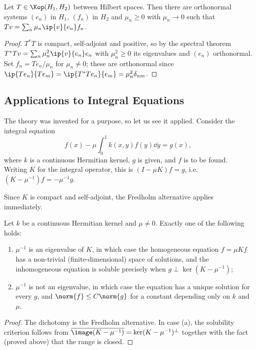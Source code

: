 \begin{corollary}
	Let $T\in\Kop(H_1,H_2)$ between Hilbert spaces. Then there are orthonormal systems $(e_n)$ in $H_1$, $(f_n)$ in $H_2$ and $\mu_n\geq0$ with $\mu_n\to0$ such that $Tv = \sum_n\mu_n\ip{v}{e_n}f_n$.
\end{corollary}

\begin{proof}
	$T^*T$ is compact, self-adjoint and positive, so by the spectral theorem $T^*Tv = \sum_n\mu_n^2\ip{v}{e_n}e_n$ with $\mu_n^2 \geq 0$ its eigenvalues and $(e_n)$ orthonormal. Set $f_n = Te_n/\mu_n$ for $\mu_n\neq0$; these are orthonormal since $\ip{Te_n}{Te_m}=\ip{T^*Te_n}{e_m}=\mu_n^2\delta_{nm}$.
\end{proof}

\subsection{Applications to Integral Equations}

The theory was invented for a purpose, so let us see it applied. Consider the integral equation
$$f(x) - \mu\int_0^1 k(x,y)f(y)\dd y = g(x),$$
where $k$ is a continuous Hermitian kernel, $g$ is given, and $f$ is to be found. Writing $K$ for the integral operator, this is $(I - \mu K)f = g$, i.e.\ $(K - \mu^{-1})f = -\mu^{-1}g$.

Since $K$ is compact and self-adjoint, the Fredholm alternative applies immediately.

\begin{proposition}
	Let $k$ be a continuous Hermitian kernel and $\mu \neq 0$. Exactly one of the following holds:
	\begin{enumerate}[label=(\alph*)]
		\item $\mu^{-1}$ is an eigenvalue of $K$, in which case the homogeneous equation $f = \mu K f$ has a non-trivial (finite-dimensional) space of solutions, and the inhomogeneous equation is soluble precisely when $g \perp \ker(K - \mu^{-1})$;
		\item $\mu^{-1}$ is not an eigenvalue, in which case the equation has a unique solution for every $g$, and $\norm{f}\leq C\norm{g}$ for a constant depending only on $k$ and $\mu$.
	\end{enumerate}
\end{proposition}

\begin{proof}
	The dichotomy is the Fredholm alternative. In case (a), the solubility criterion follows from $\overline{\image(K-\mu^{-1})} = \ker(K-\mu^{-1})^\perp$ together with the fact (proved above) that the range is closed.
\end{proof}

